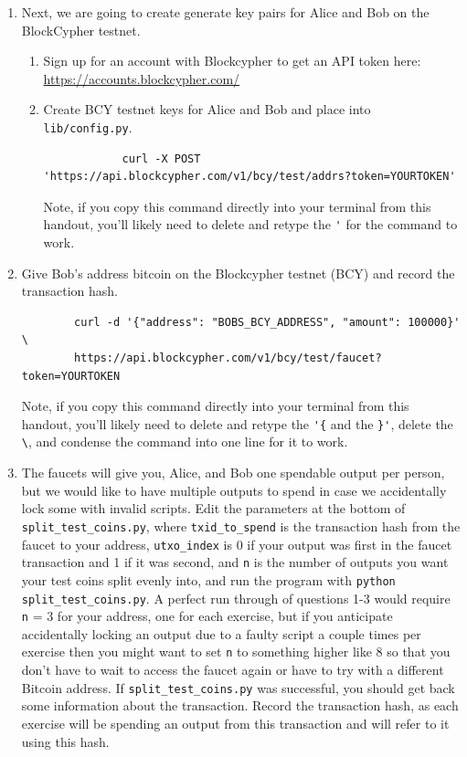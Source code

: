 \documentclass[11pt]{article}
\begin{document}
\begin{enumerate}
    \item Next, we are going to create generate key pairs for Alice and Bob on the BlockCypher testnet.
    \begin{enumerate}
		\item
			Sign up for an account with Blockcypher to get an API token here: \\
			\href{https://accounts.blockcypher.com/}{https://accounts.blockcypher.com/}
		\item
			Create BCY testnet keys for Alice and Bob and place into \texttt{lib/config.py}.
			\begin{verbatim}
  			curl -X POST 'https://api.blockcypher.com/v1/bcy/test/addrs?token=YOURTOKEN'
			\end{verbatim}
    		Note, if you copy this command directly into your terminal from this handout, you'll likely need to delete and retype the \verb|'| for the command to work.
	\end{enumerate}
	\item
		Give Bob's address bitcoin on the Blockcypher testnet (BCY) and record the transaction hash.
		\begin{verbatim}
		curl -d '{"address": "BOBS_BCY_ADDRESS", "amount": 100000}' \
		https://api.blockcypher.com/v1/bcy/test/faucet?token=YOURTOKEN
		\end{verbatim}
		Note, if you copy this command directly into your terminal from this handout, you'll likely need to delete and retype the \verb|'{| and the \verb|}'|, delete the \verb|\|, and condense the command into one line for it to work.
    \item The faucets will give you, Alice, and Bob one spendable output per person, but we would like to have multiple outputs to spend in case we accidentally lock some with invalid scripts. Edit the parameters at the bottom of \texttt{split\_test\_coins.py}, where \texttt{txid\_to\_spend} is the transaction hash from the faucet to your address, \texttt{utxo\_index} is 0 if your output was first in the faucet transaction and 1 if it was second, and \texttt{n} is the number of outputs you want your test coins split evenly into, and run the program with \texttt{python split\_test\_coins.py}. A perfect run through of questions 1-3 would require \texttt{n} = 3 for your address, one for each exercise, but if you anticipate accidentally locking an output due to a faulty script a couple times per exercise then you might want to set \texttt{n} to something higher like 8 so that you don't have to wait to access the faucet again or have to try with a different Bitcoin address. If \texttt{split\_test\_coins.py} was successful, you should get back some information about the transaction. Record the transaction hash, as each exercise will be spending an output from this transaction and will refer to it using this hash.
    

\end{enumerate}
\end{document}
